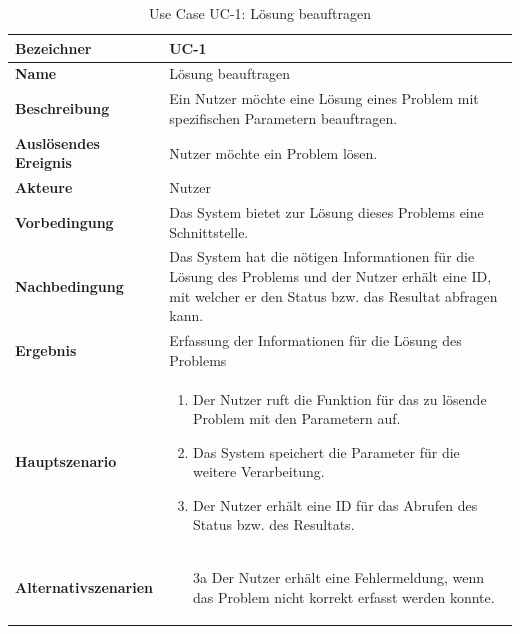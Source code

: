 \begin{table}[ht]
\centering
  \begin{tabular}{ l | p{10cm} }
	\hline
	\rowcolor{gray}
	\textbf{Bezeichner}	&	\textbf{UC-1}\\ \hline
	\textbf{Name}		&	Lösung beauftragen\\ \hline
	\textbf{Beschreibung}	&	Ein Nutzer möchte eine Lösung eines Problem mit spezifischen Parametern beauftragen.\\ \hline
	\textbf{Auslösendes Ereignis} &	Nutzer möchte ein Problem lösen.\\ \hline
	\textbf{Akteure}		&	Nutzer\\ \hline
	\textbf{Vorbedingung}	&	Das System bietet zur Lösung dieses Problems eine Schnittstelle.\\ \hline
	\textbf{Nachbedingung}	&	Das System hat die nötigen Informationen für die Lösung des Problems und der Nutzer erhält eine ID, mit welcher er den Status bzw. das Resultat 
						abfragen kann.\\ \hline
	\textbf{Ergebnis}		&	Erfassung der Informationen für die Lösung des Problems\\ \hline
	\textbf{Hauptszenario}	&	\begin{enumerate}
					\item Der Nutzer ruft die Funktion für das zu lösende Problem mit den Parametern auf.
					\item Das System speichert die Parameter für die weitere Verarbeitung.
					\item Der Nutzer erhält eine ID für das Abrufen des Status bzw. des Resultats.
					\end{enumerate}
					\\ \hline
	\textbf{Alternativszenarien}	&	\begin{enumerate}
					\item[3a] Der Nutzer erhält eine Fehlermeldung, wenn das Problem nicht korrekt erfasst werden konnte.
					\end{enumerate}
					\\ \hline
  \end{tabular}
   \caption{Use Case UC-1: Lösung beauftragen}\label{table:use_case_1}
\end{table}

